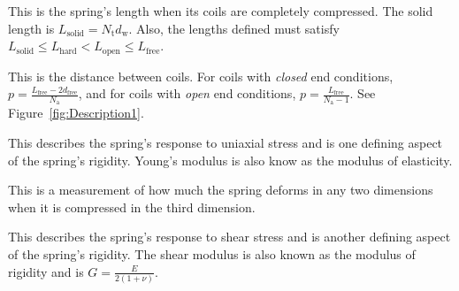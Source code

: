 \documentclass[10pt]{article}
\begin{document}
\begin{description}[leftmargin=!,labelwidth=\widthof{\bfseries Young's Modulus (E)}]
			\item[Solid Length ($\boldsymbol{L}_{\text{solid}}$)] This is the spring's length when its coils are completely compressed. The solid length is $L_{\text{solid}} = N_{\text{t}}d_{\text{w}}$. Also, the lengths defined must satisfy ${L_{\text{solid}} \le L_{\text{hard}} < L_{\text{open}} \le L_{\text{free}}}$.
					
			\item[Pitch ($\boldsymbol{p}$)] This is the distance between coils. For coils with \textit{closed} end conditions, ${p = \frac{L_{\text{free}}-2d_{\text{free}}}{N_{\text{a}}}}$, and for coils with \textit{open} end conditions, $p = \frac{L_{\text{free}}}{N_{\text{a}}-1}$. See Figure~\ref{fig:Description1}.			
			
			\item[Young's Modulus ($\boldsymbol{E}$)] This describes the spring's response to uniaxial stress and is one defining aspect of the spring's rigidity. Young's modulus is also know as the modulus of elasticity.
			
			\item[Poisson Ratio ($\boldsymbol{\nu}$)] This is a measurement of how much the spring deforms in any two dimensions when it is compressed in the third dimension.
			
			\item[Shear Modulus ($\boldsymbol{G}$)] This describes the spring's response to shear stress and is another defining aspect of the spring's rigidity. The shear modulus is also known as the modulus of rigidity and is $G = \frac{E}{2(1+\nu)}$. 
		
		\end{description}
\end{document}
